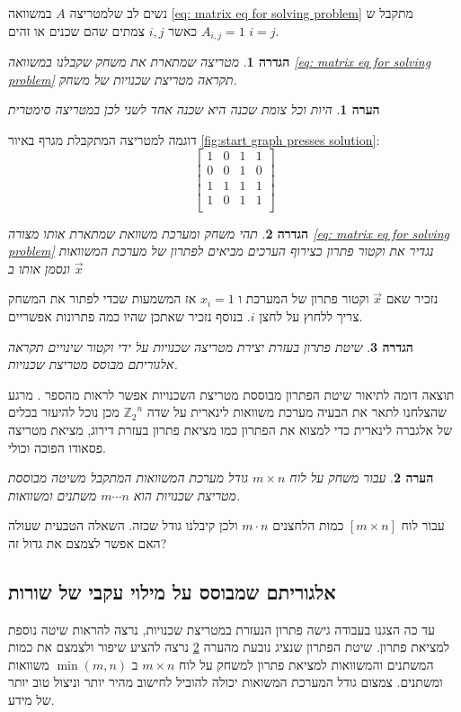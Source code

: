 \documentclass[12pt,leqno]{article}
\theoremstyle{theoremdd}
\newtheorem{definition}{הגדרה}
\newtheorem{comm}{הערה}
\newcommand{\Zn}{{\mathbb{Z}_2}^n}
\begin{document}
נשים לב שלמטריצה
$A$
במשוואה
\ref{eq: matrix eq for solving problem}
מתקבל ש
$A_{i,j} = 1$
כאשר 
$i, j$
צמתים שהם שכנים או זהים
$i = j$.
\begin{definition}
    \label{def: neighbor matrix}
    מטריצה שמתארת את משחק 
    שקבלנו במשוואה
    \ref{eq: matrix eq for solving problem}
    תקראה מטריצת שכנויות של משחק.
\end{definition}
\begin{comm}
    \label{comm: symetic matrix}
    היות וכל צומת שכנה היא שכנה אחד לשני לכן במטריצה
    סימטרית
\end{comm}
דוגמה למטריצה  המתקבלת מגרף באיור 
\ref{fig:start graph presses solution}:
\[
    \begin{bmatrix}
        1 & 0 & 1 & 1\\
        0 & 0 & 1 & 0\\
        1 & 1 & 1 & 1\\
        1 & 0 & 1 & 1\\
    \end{bmatrix}
\]
\begin{definition}
    \label{ def: solution vector}
    תהי משחק ומערכת משוואת שמתארת אותו מצורה 
    \ref{eq: matrix eq for solving problem} 
    נגדיר את וקטור פתרון כצירוף הערכים מביאים לפתרון
    של מערכת המשוואות
    ונסמן אותו ב
    $\vec{x}$
\end{definition}
נזכיר שאם
$\vec{x}$
וקטור פתרון של המערכת 
ו
$x_i = 1$
אז המשמעות שכדי לפתור את המשחק
צריך ללחוץ על לחצן 
$i$.
בנוסף 
נזכיר שאתכן שהיו כמה פתרונות אפשריים.
\begin{definition}
    \label{def: standard solution}
    שיטת פתרון בעזרת יצירת  מטריצה שכנויות על ידי וקטור שינויים תקראה
    אלגוריתם מבוסס מטריצת שכנויות.
\end{definition}
תוצאה דומה
לתיאור שיטת הפתרון מבוססת מטריצת השכנויות 
אפשר לראות מהספר
\cite{B2}.
מרגע שהצלחנו לתאר את הבעיה מערכת משוואות לינארית
על שדה
$\Zn$
מכן נוכל להיעזר בכלים של אלגברה לינארית כדי למצוא את הפתרון כמו מציאת פתרון בעזרת דירוג,
מציאת מטריצה פסאודו הפוכה וכולי. 
\begin{comm}
    \label{comm: for board too many variables}
    עבור משחק על לוח 
    $m \times n$
    גודל מערכת המשוואות המתקבל משיטה 
    מבוססת מטריצת שכנויות 
    הוא 
    $m \cdots n$
    משתנים ומשוואות.
\end{comm}
עבור לוח 
$[m \times n]$
כמות הלחצנים 
$m \cdot n$
ולכן 
קיבלנו גודל שכזה.
השאלה הטבעית שעולה האם אפשר לצמצם את גדול זה?

\subsection{אלגוריתם שמבוסס על מילוי עקבי של שורות}
עד כה
הצגנו
בעבודה
גישה פתרון
הנעזרת במטריצת שכנויות,
נרצה להראות שיטה נוספת למציאת פתרון.
שיטת הפתרון שנציג נובעת מהערה 
\ref{comm: for board too many variables}
נרצה להציע שיפור ולצמצם את כמות המשתנים והמשוואות 
למציאת פתרון למשחק על לוח 
$ m \times n$
ב
$\min(m,n)$
משוואות ומשתנים.
צמצום גודל המערכת המשואות יכולה להוביל לחישוב מהיר יותר וניצול טוב יותר של מידע.
\end{document}

